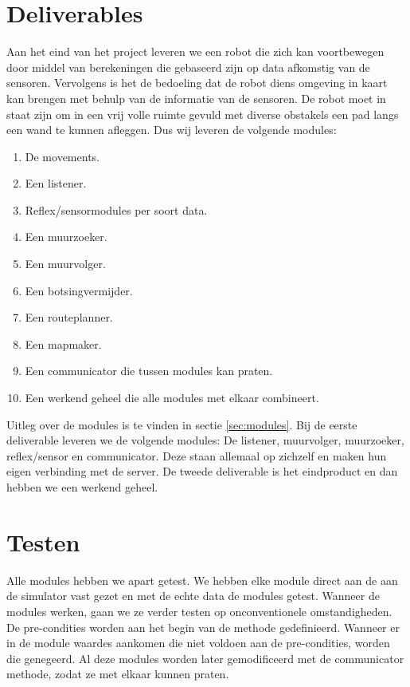 \documentclass[a4paper,10pt]{article}
\begin{document}
\section{Deliverables}
Aan het eind van het project leveren we een robot die zich kan voortbewegen door middel van berekeningen die gebaseerd zijn op data afkomstig van de sensoren. Vervolgens is het de bedoeling dat de robot diens omgeving in kaart kan brengen met behulp van de informatie van de sensoren. De robot moet in staat zijn om in een vrij volle ruimte gevuld met diverse obstakels een pad langs een wand te kunnen afleggen.
Dus wij leveren de volgende modules:
\begin{enumerate}
\item De movements.
\item Een listener.
\item Reflex/sensormodules per soort data.
\item Een muurzoeker.
\item Een muurvolger.
\item Een botsingvermijder.
\item Een routeplanner.
\item Een mapmaker.
\item Een communicator die tussen modules kan praten.
\item Een werkend geheel die alle modules met elkaar combineert.
\end{enumerate}
Uitleg over de modules is te vinden in sectie \ref{sec:modules}.
Bij de eerste deliverable leveren we de volgende modules: De listener, muurvolger, muurzoeker, reflex/sensor en communicator. Deze staan allemaal op zichzelf en maken hun eigen verbinding met de server. De tweede deliverable is het eindproduct en dan hebben we een werkend geheel.
\section{Testen}
Alle modules hebben we apart getest. We hebben elke module direct aan de aan de simulator vast gezet en met de echte data de modules getest. Wanneer de modules werken, gaan we ze verder testen op onconventionele omstandigheden. De pre-condities worden aan het begin van de methode gedefinieerd. Wanneer er in de module waardes aankomen die niet voldoen aan de pre-condities, worden die genegeerd. Al deze modules worden later gemodificeerd met de communicator methode, zodat ze met elkaar kunnen praten.
\end{document}
